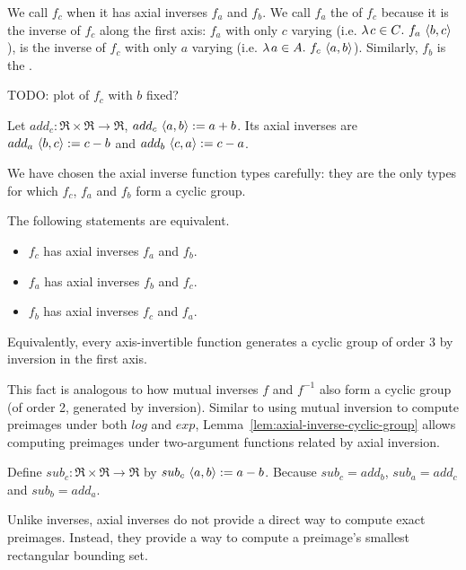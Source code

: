 \documentclass[preprint]{sigplanconf}
\begin{document}
We call $f_c$  when it has axial inverses $f_a$ and $f_b$.
We call $f_a$ the  of $f_c$ because it is the inverse of $f_c$ along the first axis: $f_a$ with only $c$ varying (i.e. $\lambda\mspace{2mu}{c \in C}\ldotp\, f_a~\langle{b,c}\rangle$), is the inverse of $f_c$ with only $a$ varying (i.e. $\lambda\mspace{2mu}{a \in A}\ldotp\, f_c~\langle{a,b}\rangle$).
Similarly, $f_b$ is the .

TODO: plot of $f_c$ with $b$ fixed?

\begin{example}
\label{ex:plus-axial-inverses}
Let $add_c : \Re \times \Re \to \Re$, $add_c~\langle{a,b}\rangle := a+b$.
Its axial inverses are $add_a~\langle{b,c}\rangle := c - b$ and $add_b~\langle{c,a}\rangle := c - a$.
\exampleqed
\end{example}

We have chosen the axial inverse function types carefully: they are the only types for which $f_c$, $f_a$ and $f_b$ form a cyclic group.

\begin{lemma}
\label{lem:axial-inverse-cyclic-group}
The following statements are equivalent.
\begin{itemize}
	\item $f_c$ has axial inverses $f_a$ and $f_b$.
	\item $f_a$ has axial inverses $f_b$ and $f_c$.
	\item $f_b$ has axial inverses $f_c$ and $f_a$.
\end{itemize}
Equivalently, every axis-invertible function generates a cyclic group of order 3 by inversion in the first axis.
\end{lemma}

This fact is analogous to how mutual inverses $f$ and $f^{-1}$ also form a cyclic group (of order 2, generated by inversion).
Similar to using mutual inversion to compute preimages under both $log$ and $exp$, Lemma~\ref{lem:axial-inverse-cyclic-group} allows computing preimages under two-argument functions related by axial inversion.

\begin{example}
Define $sub_c : \Re \times \Re \to \Re$ by $sub_c~\langle{a,b}\rangle := a-b$.
Because $sub_c = add_b$, $sub_a = add_c$ and $sub_b = add_a$.
\exampleqed
\end{example}

Unlike inverses, axial inverses do not provide a direct way to compute exact preimages.
Instead, they provide a way to compute a preimage's smallest rectangular bounding set.
\end{document}
